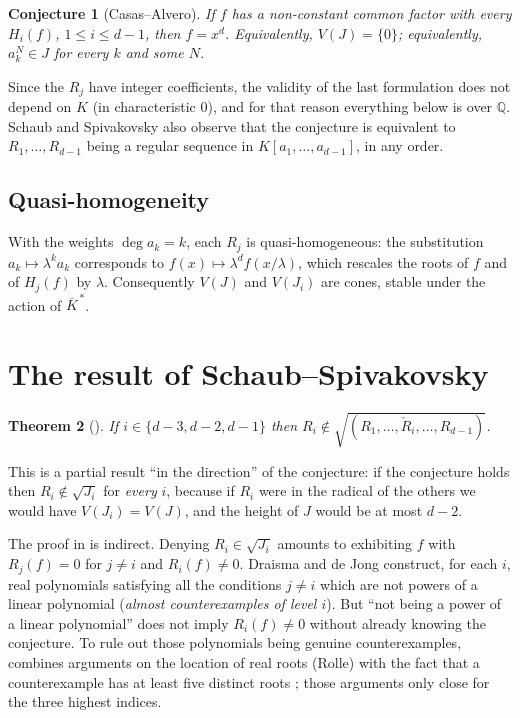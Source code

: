 \documentclass[11pt,reqno]{amsart}
\theoremstyle{plain}
\newtheorem{theorem}{Theorem}[section]
\newtheorem{conjecture}[theorem]{Conjecture}
\theoremstyle{definition}
\newcommand{\KK}{\overline{K}}
\begin{document}
\begin{conjecture}[Casas--Alvero]\label{conj:CA}
If $f$ has a non-constant common factor with every $H_i(f)$, $1\le i\le d-1$,
then $f=x^d$. Equivalently, $V(J)=\{0\}$; equivalently, $a_k^N\in J$ for every
$k$ and some $N$.
\end{conjecture}

Since the $R_j$ have integer coefficients, the validity of the last formulation
does not depend on $K$ (in characteristic $0$), and for that reason everything
below is over $\mathbb{Q}$. Schaub and Spivakovsky also observe
\cite[Rmk.~4]{SS} that the conjecture is equivalent to $R_1,\dots,R_{d-1}$ being
a regular sequence in $K[a_1,\dots,a_{d-1}]$, in any order.

\subsection*{Quasi-homogeneity}
With the weights $\deg a_k=k$, each $R_j$ is quasi-homogeneous: the substitution
$a_k\mapsto\lambda^ka_k$ corresponds to $f(x)\mapsto\lambda^df(x/\lambda)$, which
rescales the roots of $f$ and of $H_j(f)$ by $\lambda$. Consequently $V(J)$ and
$V(J_i)$ are cones, stable under the action of $\KK^{\,*}$.

\section{The result of Schaub--Spivakovsky}

\begin{theorem}[{\cite[Theorem~5]{SS}}]\label{thm:SS}
If $i\in\{d-3,d-2,d-1\}$ then
$R_i\notin\sqrt{(R_1,\dots,\check R_i,\dots,R_{d-1})}$.
\end{theorem}

This is a partial result ``in the direction'' of the conjecture: if the
conjecture holds then $R_i\notin\sqrt{J_i}$ for \emph{every} $i$, because if
$R_i$ were in the radical of the others we would have $V(J_i)=V(J)$, and the
height of $J$ would be at most $d-2$.

The proof in \cite{SS} is indirect. Denying $R_i\in\sqrt{J_i}$ amounts to
exhibiting $f$ with $R_j(f)=0$ for $j\neq i$ and $R_i(f)\neq0$. Draisma and de
Jong \cite{DdJ} construct, for each $i$, real polynomials satisfying all the
conditions $j\neq i$ which are not powers of a linear polynomial (\emph{almost
counterexamples of level $i$}). But ``not being a power of a linear polynomial''
does not imply $R_i(f)\neq0$ without already knowing the conjecture. To rule out
those polynomials being genuine counterexamples, \cite{SS} combines arguments on
the location of real roots (Rolle) with the fact that a counterexample has at
least five distinct roots \cite{CLO}; those arguments only close for the three
highest indices.
\end{document}
